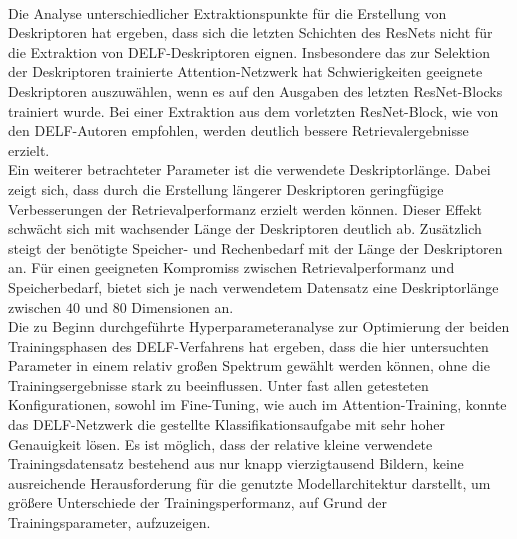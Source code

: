 \\
Die Analyse unterschiedlicher Extraktionspunkte für die Erstellung von Deskriptoren hat ergeben, dass sich die letzten Schichten des ResNets nicht für die Extraktion von DELF-Deskriptoren eignen. Insbesondere das zur Selektion der Deskriptoren trainierte Attention-Netzwerk hat Schwierigkeiten geeignete Deskriptoren auszuwählen, wenn es auf den Ausgaben des letzten ResNet-Blocks trainiert wurde. Bei einer Extraktion aus dem vorletzten ResNet-Block, wie von den DELF-Autoren empfohlen, werden deutlich bessere Retrievalergebnisse erzielt.
\\
Ein weiterer betrachteter Parameter ist die verwendete Deskriptorlänge. Dabei zeigt sich, dass durch die Erstellung längerer Deskriptoren geringfügige Verbesserungen der Retrievalperformanz erzielt werden können. Dieser Effekt schwächt sich mit wachsender Länge der Deskriptoren deutlich ab. Zusätzlich steigt der benötigte Speicher- und Rechenbedarf mit der Länge der Deskriptoren an. Für einen geeigneten Kompromiss zwischen Retrievalperformanz und Speicherbedarf, bietet sich je nach verwendetem Datensatz eine Deskriptorlänge zwischen $40$ und $80$ Dimensionen an.
\\
Die zu Beginn durchgeführte Hyperparameteranalyse zur Optimierung der beiden Trainingsphasen des DELF-Verfahrens hat ergeben, dass die hier untersuchten Parameter in einem relativ großen Spektrum gewählt werden können, ohne die Trainingsergebnisse stark zu beeinflussen. Unter fast allen getesteten Konfigurationen, sowohl im Fine-Tuning, wie auch im Attention-Training, konnte das DELF-Netzwerk die gestellte Klassifikationsaufgabe mit sehr hoher Genauigkeit lösen. Es ist möglich, dass der relative kleine verwendete Trainingsdatensatz bestehend aus nur knapp vierzigtausend Bildern, keine ausreichende Herausforderung für die genutzte Modellarchitektur darstellt, um größere Unterschiede der Trainingsperformanz, auf Grund der Trainingsparameter, aufzuzeigen.

